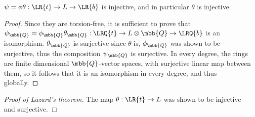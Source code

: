 \begin{lemma*}
	$\psi = \phi\theta: \LR{t} \to L \to \LR{b}$ is injective, and in particular $\theta$ is injective.
\end{lemma*}

\begin{proof}
	Since they are torsion-free, it is sufficient to prove that
	$\psi_\mbb{Q} = \phi_\mbb{Q}\theta_\mbb{Q}: \LRQ{t} \to L\otimes\mbb{Q} \to \LRQ{b}$
	is an isomorphism.
	$\theta_\mbb{Q}$ is surjective since $\theta$ is,
	$\phi_\mbb{Q}$ was shown to be surjective,
	thus the composition $\psi_\mbb{Q}$ is surjective.
	In every degree, the rings are finite dimensional $\mbb{Q}$-vector spaces, with surjective linear map between them, so it follows that it is an isomorphism in every degree, and thus globally.
\end{proof}

\begin{proof}[Proof of Lazard's theorem]
	The map $\theta: \LR{t} \to L$ was shown to be injective and surjective.
\end{proof}
